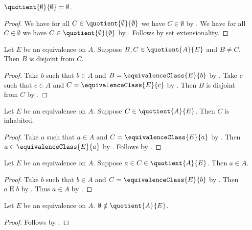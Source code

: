 \begin{proposition}\label{quotient_emptyset}
    $\quotient{\emptyset}{\emptyset} = \emptyset$.
\end{proposition}
\begin{proof}
    We have for all $C\in\quotient{\emptyset}{\emptyset}$
        we have $C\in\emptyset$ by .
    We have for all $C\in\emptyset$
        we have $C\in\quotient{\emptyset}{\emptyset}$ by .
    Follows by set extensionality.
\end{proof}


\begin{proposition}\label{quotient_elems_disjoint}
    Let $E$ be an equivalence on $A$.
    Suppose $B,C\in\quotient{A}{E}$ and $B\neq C$.
    Then $B$ is disjoint from $C$.
\end{proposition}
\begin{proof}
    Take $b$ such that $b\in A$ and $B = \equivalenceClass{E}{b}$ by .
    Take $c$ such that $c\in A$ and $C = \equivalenceClass{E}{c}$ by .
    Then $B$ is disjoint from $C$ by .
\end{proof}

\begin{proposition}\label{quotient_elems_inhabited}
    Let $E$ be an equivalence on $A$.
    Suppose $C\in\quotient{A}{E}$.
    Then $C$ is inhabited.
\end{proposition}
\begin{proof}
    Take $a$ such that $a\in A$ and $C = \equivalenceClass{E}{a}$ by .
    Then $a\in \equivalenceClass{E}{a}$ by .
    Follows by \auto.
\end{proof}

\begin{proposition}\label{quotient_elems_type}
    Let $E$ be an equivalence on $A$.
    Suppose $a\in C\in\quotient{A}{E}$.
    Then $a\in A$.
\end{proposition}
\begin{proof}
    Take $b$ such that $b\in A$ and $C = \equivalenceClass{E}{b}$
        by .
    Then $a\mathrel{E} b$ by .
    Thus $a\in A$ by .
\end{proof}


\begin{corollary}\label{quotient_notni_emptyset}
    Let $E$ be an equivalence on $A$.
    $\emptyset\notin\quotient{A}{E}$.
\end{corollary}
\begin{proof}
    Follows by .
\end{proof}

